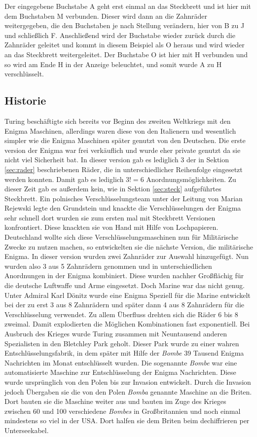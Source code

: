 Der eingegebene Buchstabe A geht erst einmal an das Steckbrett und ist hier mit dem Buchstaben M verbunden. Dieser wird dann an die Zahnräder weitergegeben, die den Buchstaben je nach Stellung verändern, hier von B zu J und schließlich F. Anschließend wird der Buchstabe wieder zurück durch die Zahnräder geleitet und kommt in diesem Beispiel als O heraus und wird wieder an das Steckbrett weitergeleitet. Der Buchstabe O ist hier mit H verbunden und so wird am Ende H in der Anzeige beleuchtet, und somit wurde A zu H verschlüsselt.

\subsection{Historie}
Turing beschäftigte sich bereits vor Beginn des zweiten Weltkriegs mit den Enigma Maschinen, allerdings waren diese von den Italienern und wesentlich simpler wie die Enigma Maschinen später genutzt von den Deutschen. Die erste version der Enigma war frei verkäuflich und wurde eher private genutzt da sie nicht viel Sicherheit bat. In dieser version gab es lediglich 3 der in Sektion \ref{sec:rader} beschriebenen Räder, die in unterschiedlicher Reihenfolge eingesetzt werden konnten. Damit gab es lediglich $3! = 6$ Anordnungsmöglichkeiten. Zu dieser Zeit gab es außerdem kein, wie in Sektion \ref{sec:steck} aufgeführtes Steckbrett. Ein polnisches Verschlüsselungsteam unter der Leitung von Marian Rejewski legte den Grundstein und knackte die Verschlüsselungen der Enigma sehr schnell dort wurden sie zum ersten mal mit Steckbrett Versionen konfrontiert. Diese knackten sie von Hand mit Hilfe von Lochpapieren. Deutschland wollte sich diese Verschlüsselungsmaschinen nun für Militärische Zwecke zu nutzen machen, so entwickelten sie die nächste Version, die militärische Enigma. In dieser version wurden zwei Zahnräder zur Auswahl hinzugefügt. Nun wurden also 3 aus 5 Zahnrädern genommen und in unterschiedlichen Anordnungen in der Enigma kombiniert. Diese wurden nachher Großflächig für die deutsche Luftwaffe und Arme eingesetzt. Doch Marine war das nicht genug. Unter Admiral Karl Dönitz wurde eine Enigma Speziell für die Marine entwickelt bei der zu erst 3 aus 8 Zahnrädern und später dann 4 aus 8 Zahnrädern für die Verschlüsselung verwendet. Zu allem Überfluss drehten sich die Räder 6 bis 8 zweimal. Damit explodierten die Möglichen Kombinationen fast exponentiell. Bei Ausbruch des Krieges wurde Turing zusammen mit Neuntausend anderen Spezialisten in den Bletchley Park geholt. Dieser Park wurde zu einer wahren Entschlüsselungsfabrik, in dem später mit Hilfe der \emph{Bombe} 39 Tausend Enigma Nachrichten im Monat entschlüsselt wurden. Die sogenannte \emph{Bombe} war eine automatisierte Maschine zur Entschlüsselung der Enigma Nachrichten. Diese wurde ursprünglich von den Polen bis zur Invasion entwickelt. Durch die Invasion jedoch Übergaben sie die von den Polen \emph{Bomba} genannte Maschine an die Briten. Dort bauten sie die Maschine weiter aus und bauten im Zuge des Krieges zwischen 60 und 100 verschiedene \emph{Bombes} in Großbritannien und noch einmal mindestens so viel in der USA. Dort halfen sie dem Briten beim dechiffrieren per Unterseekabel. \cite{enigmaproblem1} \cite{theessentialturing}

